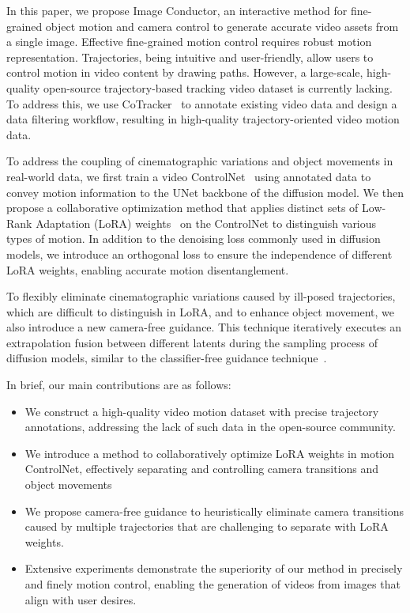 \documentclass{article} %
\begin{document}
In this paper, we propose Image Conductor, an interactive method for fine-grained object motion and camera control to generate accurate video assets from a single image. Effective fine-grained motion control requires robust motion representation. 
Trajectories, being intuitive and user-friendly, allow users to control motion in video content by drawing paths. However, a large-scale, high-quality open-source trajectory-based tracking video dataset is currently lacking. To address this, we use CoTracker~\citep{karaev2023cotracker} to annotate existing video data and design a data filtering workflow, resulting in high-quality trajectory-oriented video motion data.

To address the coupling of cinematographic variations and object movements in real-world data, we first train a video ControlNet~\citep{zhang2023adding} using annotated data to convey motion information to the UNet backbone of the diffusion model. We then propose a collaborative optimization method that applies distinct sets of Low-Rank Adaptation (LoRA) weights~\citep{hu2021lora} on the ControlNet to distinguish various types of motion. 
In addition to the denoising loss commonly used in diffusion models, we introduce an orthogonal loss to ensure the independence of different LoRA weights, enabling accurate motion disentanglement.

To flexibly eliminate cinematographic variations caused by ill-posed trajectories, which are difficult to distinguish in LoRA, and to enhance object movement, we also introduce a new camera-free guidance. This technique iteratively executes an extrapolation fusion between different latents during the sampling process of diffusion models, similar to the classifier-free guidance technique~\citep{ho2022classifier}.


In brief, our main contributions are as follows:
\begin{itemize}
\item We construct a high-quality video motion dataset with precise trajectory annotations, addressing the lack of such data in the open-source community.
\item We introduce a method to collaboratively optimize LoRA weights in motion ControlNet, effectively separating and controlling camera transitions and object movements
\item We propose camera-free guidance to heuristically eliminate camera transitions caused by multiple trajectories that are challenging to separate with LoRA weights.
\item Extensive experiments demonstrate the superiority of our method in precisely and finely motion control, enabling the generation of videos from images that align with user desires.
\end{itemize}
\end{document}
